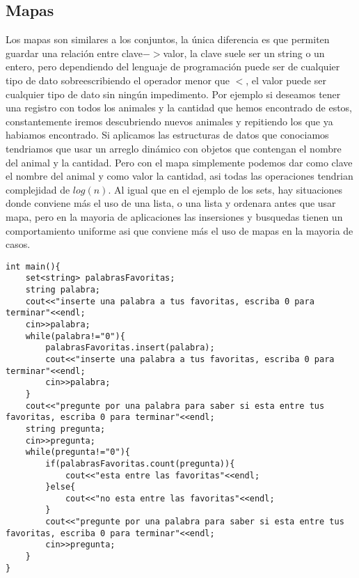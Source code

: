 \subsection{Mapas}
Los mapas son similares a los conjuntos, la única diferencia es que permiten guardar una relación entre clave$->$valor, la clave suele ser un string o un entero, pero dependiendo del lenguaje de programación puede ser de cualquier tipo de dato sobreescribiendo el operador menor que $<$, el valor puede ser cualquier tipo de dato sin ningún impedimento.
Por ejemplo si deseamos tener una registro con todos los animales y la cantidad que hemos encontrado de estos, constantemente iremos descubriendo nuevos animales y repitiendo los que ya habiamos encontrado. Si aplicamos las estructuras de datos que conociamos tendriamos que usar un arreglo dinámico con objetos que contengan el nombre del animal y la cantidad. Pero con el mapa simplemente podemos dar como clave el nombre del animal y como valor la cantidad, asi todas las operaciones tendrian complejidad de $log(n)$. Al igual que en el ejemplo de los sets, hay situaciones donde conviene más el uso de una lista, o una lista y ordenara antes que usar mapa, pero en la mayoria de aplicaciones las insersiones y busquedas tienen un comportamiento uniforme asi que conviene más el uso de mapas en la mayoria de casos.
\\\begin{minipage}{\textwidth}
\begin{lstlisting}[style=C,caption=conjunto.cpp]
int main(){
    set<string> palabrasFavoritas;
    string palabra;
    cout<<"inserte una palabra a tus favoritas, escriba 0 para terminar"<<endl;
    cin>>palabra;
    while(palabra!="0"){
        palabrasFavoritas.insert(palabra);
        cout<<"inserte una palabra a tus favoritas, escriba 0 para terminar"<<endl;
        cin>>palabra;
    }
    cout<<"pregunte por una palabra para saber si esta entre tus favoritas, escriba 0 para terminar"<<endl;
    string pregunta;
    cin>>pregunta;
    while(pregunta!="0"){
        if(palabrasFavoritas.count(pregunta)){
            cout<<"esta entre las favoritas"<<endl;
        }else{
            cout<<"no esta entre las favoritas"<<endl;
        }
        cout<<"pregunte por una palabra para saber si esta entre tus favoritas, escriba 0 para terminar"<<endl;
        cin>>pregunta;
    }
}
\end{lstlisting}
\end{minipage}